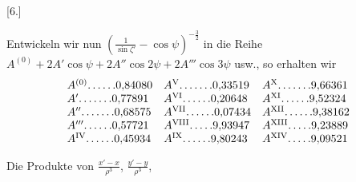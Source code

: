 \clearpage
\begingroup
{}
\renewcommand{\headrulewidth}{0pt}
\par\medskip
{}
\begin{center}[6.]\end{center}
\begingroup
\small
\par\noindent\hspace*{\parindent}Entwickeln wir nun \(\left(\frac{1}{\sin\zeta'}-\cos\psi\right)^{-\frac32}\)
in die Reihe \(A^{(0)}+2A'\cos\psi+2A''\cos2\psi+2A'''\cos3\psi\) usw., so erhalten wir
\[
\begin{array}{@{}l@{\quad}l@{\quad}l@{}}
A^{(0)}\mathord{.}\,\mathord{.}\,\mathord{.}\,\mathord{.}\,\mathord{.}\,\mathord{.}0{,}84080&A^{\mathrm{V}}\mathord{.}\,\mathord{.}\,\mathord{.}\,\mathord{.}\,\mathord{.}\,\mathord{.}\,\mathord{.}0{,}33519&A^{\mathrm{X}}\mathord{.}\,\mathord{.}\,\mathord{.}\,\mathord{.}\,\mathord{.}\,\mathord{.}\,\mathord{.}9{,}66361\\
A'\mathord{.}\,\mathord{.}\,\mathord{.}\,\mathord{.}\,\mathord{.}\,\mathord{.}\,\mathord{.}0{,}77891&A^{\mathrm{VI}}\mathord{.}\,\mathord{.}\,\mathord{.}\,\mathord{.}\,\mathord{.}\,\mathord{.}0{,}20648&A^{\mathrm{XI}}\mathord{.}\,\mathord{.}\,\mathord{.}\,\mathord{.}\,\mathord{.}\,\mathord{.}9{,}52324\\
A''\mathord{.}\,\mathord{.}\,\mathord{.}\,\mathord{.}\,\mathord{.}\,\mathord{.}\,\mathord{.}0{,}68575&A^{\mathrm{VII}}\mathord{.}\,\mathord{.}\,\mathord{.}\,\mathord{.}\,\mathord{.}\,\mathord{.}0{,}07434&A^{\mathrm{XII}}\mathord{.}\,\mathord{.}\,\mathord{.}\,\mathord{.}\,\mathord{.}\,\mathord{.}9{,}38162\\
A'''\mathord{.}\,\mathord{.}\,\mathord{.}\,\mathord{.}\,\mathord{.}\,\mathord{.}0{,}57721&A^{\mathrm{VIII}}\mathord{.}\,\mathord{.}\,\mathord{.}\,\mathord{.}\,\mathord{.}9{,}93947&A^{\mathrm{XIII}}\mathord{.}\,\mathord{.}\,\mathord{.}\,\mathord{.}\,\mathord{.}9{,}23889\\
A^{\mathrm{IV}}\mathord{.}\,\mathord{.}\,\mathord{.}\,\mathord{.}\,\mathord{.}\,\mathord{.}0{,}45934&A^{\mathrm{IX}}\mathord{.}\,\mathord{.}\,\mathord{.}\,\mathord{.}\,\mathord{.}\,\mathord{.}9{,}80243&A^{\mathrm{XIV}}\mathord{.}\,\mathord{.}\,\mathord{.}\,\mathord{.}\,\mathord{.}9{,}09521
\end{array}
\]
\par\noindent\hspace*{\parindent}Die Produkte von \(\frac{x'-x}{\rho^3}\), \(\frac{y'-y}{\rho^3}\),

